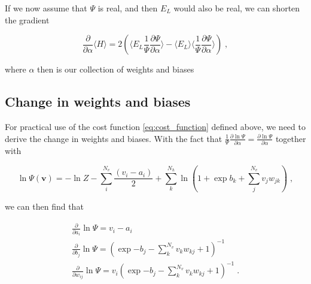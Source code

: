 If we now assume that $\Psi$ is real, and then $E_L$ would also be real, we can shorten the gradient

\begin{equation}
  \frac{\partial}{\partial\alpha} \langle H \rangle = 2\left(\langle E_L \frac{1}{\Psi}\frac{\partial\Psi}{\partial\alpha}\rangle - \langle E_L \rangle\langle\frac{1}{\Psi}\frac{\partial\Psi}{\partial\alpha}\rangle\right ) \; ,
  \label{eq:cost_function}
\end{equation}

where $\alpha$ then is our collection of weights and biases
\subsection{Change in weights and biases}

For practical use of the cost function \ref{eq:cost_function} defined above, we need to derive the change in weights and biases. With the fact that $\frac{1}{\Psi}\frac{\partial\ln{\Psi}}{\partial\alpha} = \frac{\partial\ln{\Psi}}{\partial\alpha}$ together with

\begin{equation}
  \ln{\Psi(\boldsymbol{v})} = -\ln{Z}-\sum_{i}^{N_v}\frac{(v_i-a_i)}{2}+\sum_{k}^{N_h} \ln{\left (1+\exp{b_k+\sum_j^{N_v}v_jw_{jk}}\right)} \; ,
  \label{eq:log_psi}
\end{equation}

we can then find that

\begin{gather}
  \frac{\partial}{\partial a_i} \ln{\Psi}= v_i - a_i\\
  \frac{\partial}{\partial b_j} \ln{\Psi}= \left (\exp{-b_j-\sum_k^{N_v}v_kw_{kj}}+1\right)^{-1} \\
  \frac{\partial}{\partial w_{ij}}\ln{\Psi} =v_i\left (\exp{-b_j-\sum_k^{N_v}v_kw_{kj}}+1\right)^{-1} \; . 
\end{gather}
